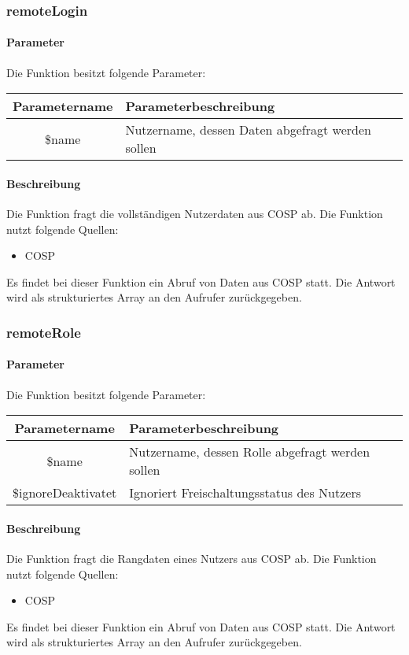 \subsubsection{remoteLogin}
\paragraph{Parameter} Die Funktion besitzt folgende Parameter:
\begin{table}[H]
	\begin{tabular}{|c|p{11cm}|}
		\hline
		\textbf{Parametername} & \textbf{Parameterbeschreibung} \\ \hline
		\$name & Nutzername, dessen Daten abgefragt werden sollen \\ \hline
	\end{tabular}
\end{table}
\paragraph{Beschreibung} Die Funktion fragt die vollständigen Nutzerdaten aus {\glqq COSP\grqq} ab. Die Funktion nutzt folgende Quellen:
\begin{itemize}
	\item COSP
\end{itemize}
Es findet bei dieser Funktion ein Abruf von Daten aus {\glqq COSP\grqq} statt. Die Antwort wird als strukturiertes Array an den Aufrufer zurückgegeben.
\subsubsection{remoteRole}
\paragraph{Parameter} Die Funktion besitzt folgende Parameter:
\begin{table}[H]
	\begin{tabular}{|c|p{11cm}|}
		\hline
		\textbf{Parametername} & \textbf{Parameterbeschreibung} \\ \hline
		\$name              & Nutzername, dessen Rolle abgefragt werden sollen \\ \hline
		\$ignoreDeaktivatet & Ignoriert Freischaltungsstatus des Nutzers \\ \hline
	\end{tabular}
\end{table}
\paragraph{Beschreibung} Die Funktion fragt die Rangdaten eines Nutzers aus {\glqq COSP\grqq} ab. Die Funktion nutzt folgende Quellen:
\begin{itemize}
	\item COSP
\end{itemize}
Es findet bei dieser Funktion ein Abruf von Daten aus {\glqq COSP\grqq} statt. Die Antwort wird als strukturiertes Array an den Aufrufer zurückgegeben.
